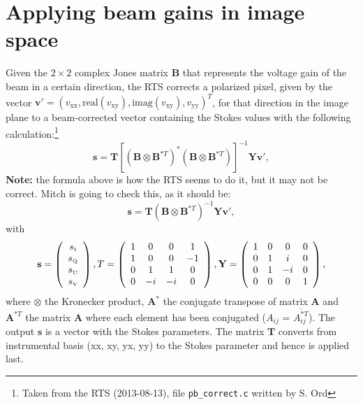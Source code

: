 \documentclass[a4paper,11pt]{article}
\begin{document}
\section{Applying beam gains in image space}
Given the $2\times 2$ complex Jones matrix $\mathbf{B}$ that represents the voltage gain of the beam in a certain direction, the RTS corrects a polarized pixel, given by the vector $\textbf{v}' = \left(v_\textrm{xx}, \textrm{real}(v_\textrm{xy}), \textrm{imag}(v_\textrm{xy}), v_\textrm{yy} \right)^T$, for that direction in the image plane to a beam-corrected vector containing the Stokes values with the following calculation:\footnote{Taken from the RTS (2013-08-13), file \texttt{pb\_correct.c} written by S. Ord}
\begin{equation} \label{apply-beam-image-space}
 \textbf{s} =
\mathbf{T} \left[ \left(\mathbf{B} \otimes \mathbf{B}^{*T} \right)^* \left(\mathbf{B} \otimes \mathbf{B}^{*T} \right)\right]^{-1} \mathbf{Y} \mathbf{v}',
\end{equation}
\textbf{Note:} the formula above is how the RTS seems to do it, but it may not be correct. Mitch is going to check this, as it should be:
\begin{equation}
 \textbf{s} =
\mathbf{T} \left(\mathbf{B} \otimes \mathbf{B}^{*T} \right)^{-1} \mathbf{Y} \mathbf{v}',
\end{equation}
with
\begin{equation}
\textbf{s} = \left( \begin{array}{c}
s_\textrm{\tiny{I}} \\
s_\textrm{\tiny{Q}} \\
s_\textrm{\tiny{U}} \\
s_\textrm{\tiny{V}} \end{array} \right),
T = \left( \begin{array}{cccc}
1 & 0 & 0 & 1 \\
1 & 0 & 0 & -1 \\
0 & 1 & 1 & 0 \\
0 & -i & -i & 0 \end{array} \right), \mathbf{Y} = \left( \begin{array}{cccc}
1 & 0 & 0 & 0 \\
0 & 1 & i & 0 \\
0 & 1 & -i & 0 \\
0 & 0 & 0 & 1
\end{array} \right),
\end{equation}
where $\otimes$ the Kronecker product, $\mathbf{A}^*$ the conjugate transpose of matrix $\mathbf{A}$ and $\mathbf{A}^{*T}$ the matrix $\mathbf{A}$ where each element has been conjugated ($A_{ij}$ = $\overline{A^{*T}_{ij}}$). The output $\textbf{s}$ is a vector with the Stokes parameters. The matrix $\mathbf{T}$ converts from instrumental basis (xx, xy, yx, yy) to the Stokes parameter and hence is applied last.
\end{document}
